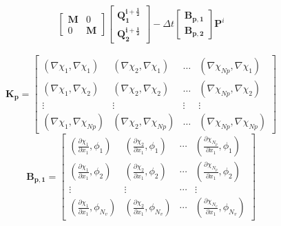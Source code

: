 \documentclass[12pt]{report}
\newcommand{\dotprod}[2]{\left(#1, #2\right)}
\newcommand{\grad}[1]{\nabla#1}
\newcommand{\vecf}[1]{\mathbf{#1}}
\begin{document}
\begin{equation}
\begin{aligned}
\begin{bmatrix}
		\mathbf{M} & 0 \\
		0 & \mathbf{M}
	\end{bmatrix} \begin{bmatrix}
		\vecf{Q^{i+\frac{1}{2}}_1} \\
		\vecf{Q^{i+\frac{1}{2}}_2}
	\end{bmatrix} - \Delta t \begin{bmatrix}
		\vecf{B_{p,1}} \\
		\vecf{B_{p,2}}
	\end{bmatrix} \vecf{P}^i
\end{aligned}\label{eq:chorin_split_fem}
\end{equation}

\begin{equation*}
	\mathbf{K_p} = \begin{bmatrix}
		\dotprod{\grad{\chi_1}}{\grad{\chi_1}} & \dotprod{\grad{\chi_2}}{\grad{\chi_1}} & \dots & \dotprod{\grad{\chi_{Np}}}{\grad{\chi_1}}\\
		\dotprod{\grad{\chi_1}}{\grad{\chi_2}} & \dotprod{\grad{\chi_2}}{\grad{\chi_2}} & \dots & \dotprod{\grad{\chi_{Np}}}{\grad{\chi_2}}\\
		\vdots & \vdots & \vdots & \vdots\\
		\dotprod{\grad{\chi_1}}{\grad{\chi_{Np}}} & \dotprod{\grad{\chi_2}}{\grad{\chi_{Np}}} & \dots & \dotprod{\grad{\chi_{Np}}}{\grad{\chi_{Np}}}
	\end{bmatrix}
\end{equation*}
\begin{equation*}
	\mathbf{B_{p,1}} = \begin{bmatrix}
		\left(\frac{\partial\chi_1}{\partial x_1}, \phi_1\right) & \left(\frac{\partial\chi_2}{\partial x_1}, \phi_1\right) & \cdots & \left(\frac{\partial\chi_{N_p}}{\partial x_1}, \phi_1\right) \\
		\left(\frac{\partial\chi_1}{\partial x_1}, \phi_2\right) & \left(\frac{\partial\chi_2}{\partial x_1}, \phi_2\right) & \cdots & \left(\frac{\partial\chi_{N_p}}{\partial x_1}, \phi_2\right) \\
		\vdots & \vdots & \cdots & \vdots \\
		\left(\frac{\partial\chi_1}{\partial x_1}, \phi_{N_v}\right) & \left(\frac{\partial\chi_2}{\partial x_1}, \phi_{N_v}\right) & \cdots & \left(\frac{\partial\chi_{N_v}}{\partial x_1}, \phi_{N_v}\right)
	\end{bmatrix}
\end{equation*}
\end{document}
